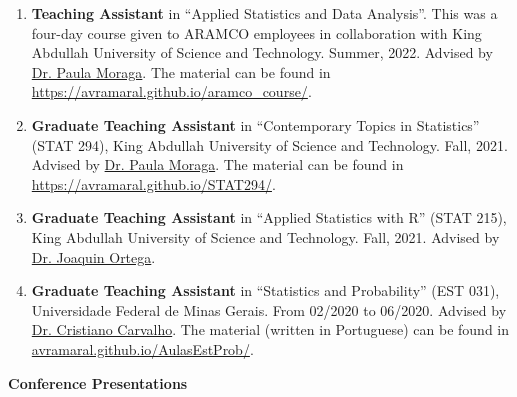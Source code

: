 \documentclass[11pt, ]{article}
\begin{document}
	\begin{enumerate}
		\item \textbf{Teaching Assistant} in ``Applied Statistics and Data Analysis''. This was a four-day course given to ARAMCO employees in collaboration with King Abdullah University of Science and Technology. Summer, 2022. Advised by \href{https://www.paulamoraga.com/}{Dr. Paula Moraga}. The material can be found in \href{https://avramaral.github.io/aramco\_course/}{https://avramaral.github.io/aramco\_course/}.
		
		\item \textbf{Graduate Teaching Assistant} in ``Contemporary Topics in Statistics'' (STAT 294), King Abdullah University of Science and Technology. Fall, 2021. Advised by \href{https://www.paulamoraga.com/}{Dr. Paula Moraga}. The material can be found in \href{https://avramaral.github.io/STAT294/}{https://avramaral.github.io/STAT294/}.
		
		\item \textbf{Graduate Teaching Assistant} in ``Applied Statistics with R'' (STAT 215), King Abdullah University of Science and Technology. Fall, 2021. Advised by \href{https://cemse.kaust.edu.sa/people/person/joaquin-ortega-sanchez}{Dr. Joaquin Ortega}.
		
		\item \textbf{Graduate Teaching Assistant} in ``Statistics and Probability'' (EST 031), Universidade Federal de Minas Gerais. From 02/2020 to 06/2020. Advised by \href{http://www.est.ufmg.br/~cristianocs/}{Dr. Cristiano Carvalho}. The material (written in Portuguese) can be found in \href{https://avramaral.github.io/AulasEstProb/}{avramaral.github.io/AulasEstProb/}.
	\end{enumerate}

\vspace{6pt}

%
%

%
%

{\Large \textbf{Conference Presentations}}
\end{document}
